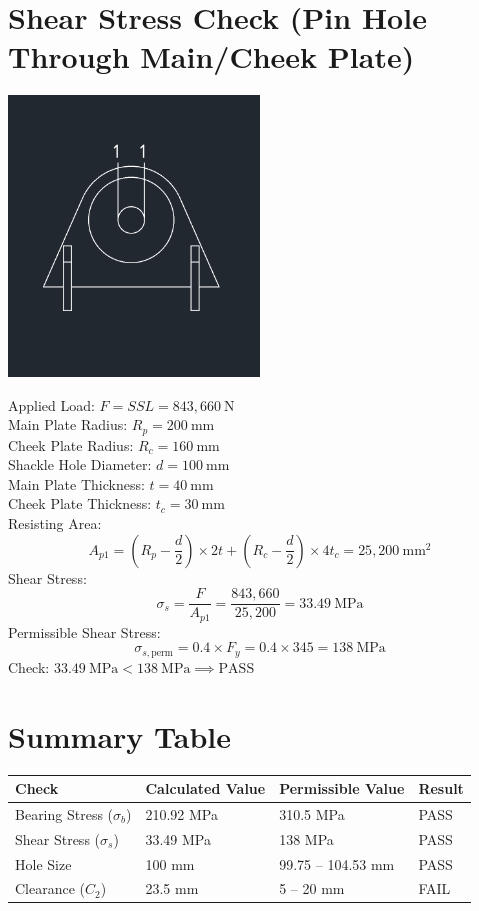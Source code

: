 \documentclass[12pt]{article}
\begin{document}
\section{Shear Stress Check (Pin Hole Through Main/Cheek Plate)}
\begin{center}
\includegraphics[width=0.5\textwidth]{image-2.png}
\end{center}
Applied Load: $F = SSL = 843,660\ \mathrm{N}$\\
Main Plate Radius: $R_p = 200\ \mathrm{mm}$\\
Cheek Plate Radius: $R_c = 160\ \mathrm{mm}$\\
Shackle Hole Diameter: $d = 100\ \mathrm{mm}$\\
Main Plate Thickness: $t = 40\ \mathrm{mm}$\\
Cheek Plate Thickness: $t_c = 30\ \mathrm{mm}$\\
Resisting Area:
\[
A_{p1} = (R_p - \frac{d}{2}) \times 2t + (R_c - \frac{d}{2}) \times 4t_c = 25,200\ \mathrm{mm}^2
\]
Shear Stress:
\[
\sigma_s = \frac{F}{A_{p1}} = \frac{843,660}{25,200} = 33.49\ \mathrm{MPa}
\]
Permissible Shear Stress:
\[
\sigma_{s,\text{perm}} = 0.4 \times F_y = 0.4 \times 345 = 138\ \mathrm{MPa}
\]
Check: $33.49\ \mathrm{MPa} < 138\ \mathrm{MPa} \implies \text{PASS}$

\section{Summary Table}
\begin{center}
\begin{tabular}{|l|l|l|l|}
\hline
Check & Calculated Value & Permissible Value & Result \\
\hline
Bearing Stress ($\sigma_b$) & 210.92 MPa & 310.5 MPa & PASS \\
Shear Stress ($\sigma_s$) & 33.49 MPa & 138 MPa & PASS \\
Hole Size & 100 mm & 99.75 -- 104.53 mm & PASS \\
Clearance ($C_2$) & 23.5 mm & 5 -- 20 mm & FAIL \\
\hline
\end{tabular}
\end{center}
\end{document}
